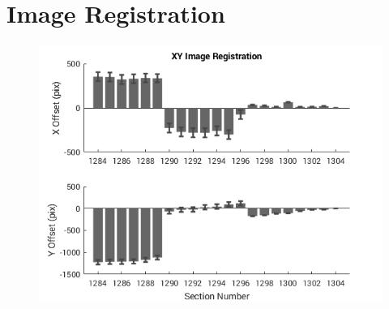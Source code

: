 \documentclass[12pt]{exam}
\begin{document}

	\section{Image Registration}
	\begin{figure}
		\includegraphics[width=\linewidth]{xyAlign}
	\end{figure}
\end{document}

